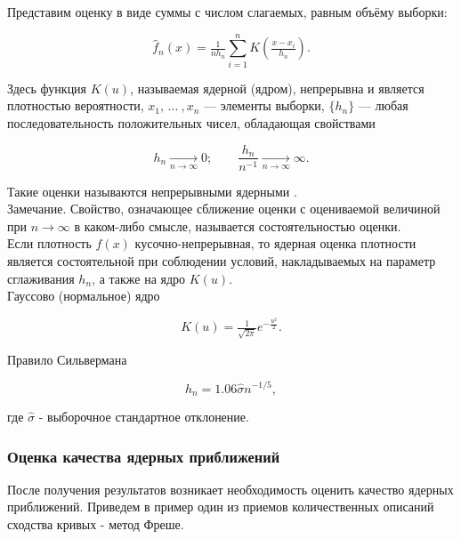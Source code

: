 \documentclass[report.tex]{subfiles}
\begin{document}
Представим оценку в виде суммы с числом слагаемых, равным объёму выборки:

\begin{equation}
    \widehat{f}_n(x) = \tfrac{1}{nh_n}\sum\limits_{i=1}^n K\left( \tfrac{x - x_i}{h_n} \right).
\end{equation}

Здесь функция $K(u)$, называемая ядерной (ядром), непрерывна и является плотностью вероятности, $x_1, \, ... \: , x_n$ --- элементы выборки, $\{h_n\}$ --- любая последовательность положительных чисел, обладающая свойствами

\begin{equation}
    h_n \underset{n \to \infty}{\longrightarrow} 0; \qquad \dfrac{h_n}{n^{-1}} \underset{n \to \infty}{\longrightarrow} \infty.
\end{equation}

Такие оценки называются непрерывными ядерными \cite[с. 421-423]{b:probSectMath}.\\

Замечание. Свойство, означающее сближение оценки с оцениваемой величиной при $n \rightarrow \infty$ в каком-либо смысле, называется состоятельностью оценки.\\

Если плотность $f(x)$ кусочно-непрерывная, то ядерная оценка плотности является состоятельной при соблюдении условий, накладываемых на параметр сглаживания $h_n$, а также на ядро $K(u)$.\\

Гауссово (нормальное) ядро \cite[с. 38]{a:nonParamRegr}

\begin{equation}
    K(u) = \tfrac{1}{\sqrt{2\pi}}e^{-\tfrac{u^2}{2}}.
\end{equation}

Правило Сильвермана \cite[с. 44]{a:nonParamRegr}

\begin{equation}
    h_n = 1.06\hat{\sigma}n^{-1/5},
\end{equation}

где $\hat{\sigma}$ - выборочное стандартное отклонение.

\subsubsection{Оценка качества ядерных приближений}

После получения результатов возникает необходимость оценить качество ядерных приближений. Приведем в пример один из приемов количественных описаний сходства кривых - метод Фреше. \\
\end{document}
